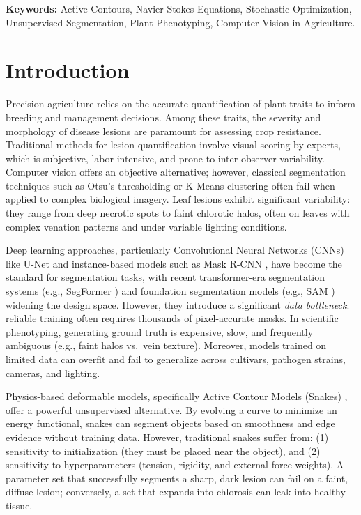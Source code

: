 \documentclass[11pt,a4paper]{article}
\begin{document}
\medskip\noindent\textbf{Keywords:} Active Contours, Navier-Stokes Equations, Stochastic Optimization, Unsupervised Segmentation, Plant Phenotyping, Computer Vision in Agriculture.

\section{Introduction}
Precision agriculture relies on the accurate quantification of plant traits to inform breeding and management decisions. Among these traits, the severity and morphology of disease lesions are paramount for assessing crop resistance. Traditional methods for lesion quantification involve visual scoring by experts, which is subjective, labor-intensive, and prone to inter-observer variability. Computer vision offers an objective alternative; however, classical segmentation techniques such as Otsu's thresholding or K-Means clustering often fail when applied to complex biological imagery. Leaf lesions exhibit significant variability: they range from deep necrotic spots to faint chlorotic halos, often on leaves with complex venation patterns and under variable lighting conditions.

Deep learning approaches, particularly Convolutional Neural Networks (CNNs) like U-Net \citep{ronneberger2015u} and instance-based models such as Mask R-CNN \citep{he2017mask}, have become the standard for segmentation tasks, with recent transformer-era segmentation systems (e.g., SegFormer \citep{xie2021segformer}) and foundation segmentation models (e.g., SAM \citep{kirillov2023segment}) widening the design space. However, they introduce a significant \emph{data bottleneck}: reliable training often requires thousands of pixel-accurate masks. In scientific phenotyping, generating ground truth is expensive, slow, and frequently ambiguous (e.g., faint halos vs.\ vein texture). Moreover, models trained on limited data can overfit and fail to generalize across cultivars, pathogen strains, cameras, and lighting.

Physics-based deformable models, specifically Active Contour Models (Snakes) \citep{kass1988snakes}, offer a powerful unsupervised alternative. By evolving a curve to minimize an energy functional, snakes can segment objects based on smoothness and edge evidence without training data. However, traditional snakes suffer from: (1) sensitivity to initialization (they must be placed near the object), and (2) sensitivity to hyperparameters (tension, rigidity, and external-force weights). A parameter set that successfully segments a sharp, dark lesion can fail on a faint, diffuse lesion; conversely, a set that expands into chlorosis can leak into healthy tissue.
\end{document}
